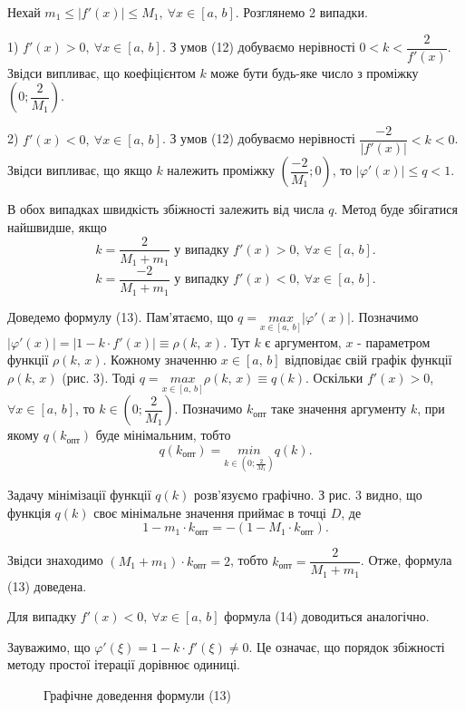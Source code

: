\documentclass[14pt,a4paper,titlepage]{extarticle}
\begin{document}
Нехай $m_1\leqslant\left|f'(x)\right|\leqslant M_1,\ \forall x\in[a,\, b]$. Розглянемо 2 випадки.

1) $f'(x)>0,\ \forall x\in[a,\, b]$. З умов (12) добуваємо нерівності $0<k<\dfrac{2}{f'(x)}$. Звідси випливає, що коефіцієнтом $k$ може бути будь-яке число з проміжку $\left(0;\dfrac{2}{M_1}\right)$.

2) $f'(x)<0,\ \forall x\in[a,\, b]$. З умов (12) добуваємо нерівності $\dfrac{-2}{\left|f'(x)\right|}<k<0$. Звідси випливає, що якщо $k$ належить проміжку $\left(\dfrac{-2}{M_1};0\right)$, то $\left|\varphi'(x)\right|\leqslant q<1$.

В обох випадках швидкість збіжності залежить від числа $q$. Метод буде збігатися найшвидше, якщо 
\begin{equation}
k=\frac{2}{M_1+m_1}\text{ у випадку }f'(x)>0,\ \forall x\in[a,\, b].
\end{equation}
\begin{equation}
k=\frac{-2}{M_1+m_1}\text{ у випадку }f'(x)<0,\ \forall x\in[a,\, b].
\end{equation}

Доведемо формулу (13). Пам'ятаємо, що $q=\underset{x\in [a,\, b]}{max}\left|\varphi'(x)\right|$. Позначимо $\left|\varphi'(x)\right|=\left|1-k\cdot f'(x)\right|\equiv\rho(k,\,x)$. Тут $k$ є аргументом, $x$ - параметром функції $\rho(k,\,x)$. Кожному значенню $x\in[a,\, b]$ відповідає свій графік функції $\rho(k,\,x)$ (рис. 3). Тоді $q=\underset{x\in [a,\, b]}{max}\rho(k,\,x)\equiv q(k)$. Оскільки $f'(x)>0$, $\forall x\in[a,\, b]$, то $k\in\left(0;\dfrac{2}{M_1}\right)$. Позначимо $k_{\text{опт}}$ таке значення аргументу $k$, при якому  
$q(k_{\text{опт}})$ буде мінімальним, тобто
$$
q(k_{\text{опт}})=\underset{k\in\left(0;\frac{2}{M_1}\right)}{min}q(k).
$$

Задачу мінімізації функції $q(k)$ розв'язуємо графічно. З рис. 3 видно, що функція $q(k)$ своє мінімальне значення приймає в точці $D$, де
$$
1-m_1\cdot k_{\text{опт}}=-(1-M_1\cdot k_{\text{опт}}).
$$

Звідси знаходимо $(M_1+m_1)\cdot k_{\text{опт}}=2$, тобто $k_{\text{опт}}=\dfrac{2}{M_1+m_1}$. Отже, формула (13) доведена.

Для випадку $f'(x)<0,\ \forall x\in[a,\, b]$ формула (14) доводиться аналогічно.

Зауважимо, що $\varphi'(\xi)=1-k\cdot f'(\xi)\neq0$. Це означає, що порядок збіжності методу простої ітерації дорівнює одиниці.
\begin{figure}[h]
\center{\texttt{[image: 4]}}
\caption{Графічне доведення формули (13)}
\end{figure}
\end{document}
